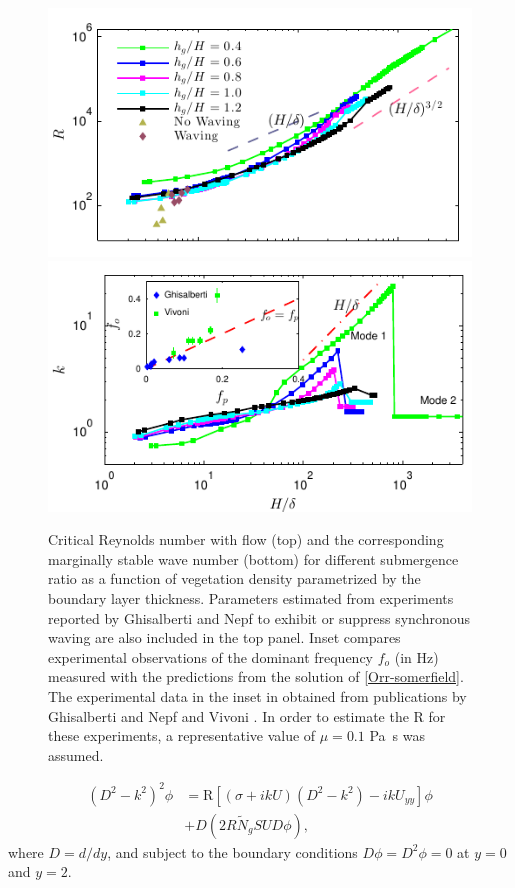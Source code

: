 \documentclass[aps,prl,twocolumn,superscriptaddress,10pt]{revtex4-1}  %
\newcommand{\Rey}{\text{R}}
\newcommand{\Ndg}{\tilde{N}_g}
\begin{document}
\begin{figure}
\begin{center}
\includegraphics[]{Critical_Re_vs_delta_noshear} \\
\vspace{-6mm} \hspace{-3mm}
\includegraphics[]{K_vs_shear_width_noshear}
\end{center}
\caption{Critical Reynolds number with flow (top) and the corresponding marginally stable wave number (bottom) for different submergence ratio as a function of vegetation density
 parametrized by the boundary layer thickness. Parameters estimated from experiments reported by Ghisalberti and Nepf\cite{Ghisal02} to exhibit or suppress synchronous waving are 
also included in the top panel. Inset compares experimental observations 
of the dominant frequency $f_o$ (in Hz) measured with the predictions from the solution of \eqref{Orr-somerfield}. The experimental data in the inset in obtained from publications by 
Ghisalberti and Nepf \cite{Ghisal02} and Vivoni \cite{Vivoni98}. In order to estimate the $\Rey$ for these experiments, a representative value of $\mu=0.1$ Pa~s was assumed.}
\label{Re_vs_delta}
\end{figure}
\begin{equation}
\begin{split}
\left(D^2 -k^{2} \right)^2\phi &= \Rey \left[ \left({\sigma}+ikU\right) \left(D^2-k^2\right) -ikU_{yy}\right]\phi \\
&+D\left(2R \Ndg S U D \phi\right),
\label{Orr-somerfield}
\end{split}
\end{equation}
where $D=d/dy$, and subject to the boundary conditions $D\phi = D^2\phi = 0$ at $y=0$ and $y=2$. 
\end{document}
